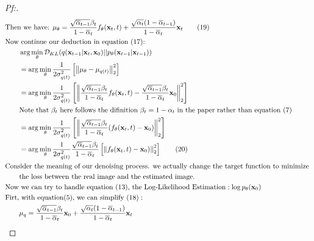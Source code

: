\documentclass{article}
\begin{document}
\begin{proof}[\textit{Pf:}]
\begin{align}
        &\text{Then we have: } \mu_{\theta} = \frac{\sqrt{\overline{\alpha}_{t-1}}\beta_t}{1-\overline{\alpha}_t}f_{\theta}(\mathbf{x}_t, t) + \frac{\sqrt{\alpha_{t}}(1-\overline{\alpha}_{t-1})}{1-\overline{\alpha}_t}\mathbf{x}_t \tag{19} \\
        &\text{Now continue our deduction in equation (17): } \notag \\
        &\qquad\arg\min_{\theta} \mathcal{D}_{KL}(q(\mathbf{x}_{t-1}|\mathbf{x}_t, \mathbf{x}_0) || p_{\theta}(\mathbf{x}_{t-1}|\mathbf{x}_{t-1})) \notag \\
        &\qquad = \arg\min_{\theta} \frac{1}{2\sigma_{q(t)}^2} \left[ \left\lVert  \mu_{\theta} - \mu_{q(t)} \right\rVert ^2_2 \right] \notag \\
        &\qquad = \arg\min_{\theta} \frac{1}{2\sigma_{q(t)}^2} \left[ 
            \left\lVert \frac{\sqrt{\overline{\alpha}_{t-1}}\beta_t}{1-\overline{\alpha}_t}f_{\theta}(\mathbf{x}_t, t) 
            - \frac{\sqrt{\overline{\alpha}_{t-1}}\beta_t}{1-\overline{\alpha}_t}\mathbf{x}_0 \right\rVert ^2_2\right] \notag \\
        &\qquad\text{Note that } \beta_t\text{ here follows the difinition }\beta_t=1-\alpha_t \text{ in the paper rather than equation (7)} \notag \\
        &\qquad = \arg\min_{\theta} \frac{1}{2\sigma_{q(t)}^2} \left[ 
            \left\lVert \frac{\sqrt{\overline{\alpha}_{t-1}}\beta_t}{1-\overline{\alpha}_t}(f_{\theta}(\mathbf{x}_t, t) 
            - \mathbf{x}_0) \right\rVert ^2_2\right] \notag \\
        &\qquad = \arg\min_{\theta} \frac{1}{2\sigma_{q(t)}^2} \frac{\sqrt{\overline{\alpha}_{t-1}}\beta_t}{1-\overline{\alpha}_t}
            \left[ \left\lVert f_{\theta}(\mathbf{x}_t, t)- \mathbf{x}_0) \right\rVert^2_2 \right] \tag{20} \\
        &\text{Consider the meaning of our denoising process. we actually change the target function to minimize } \notag \\
        &\qquad\text{the loss between the real image and the estimated image.} \notag \\
        &\text{Now we can try to handle equation (13), the Log-Likelihood Estimation}: \log p_{\theta}(\mathbf{x}_0) \notag \\
        &\text{Firt, with equation(5), we can simplify (18)}: \notag \\
        &\qquad \mu_q = \frac{\sqrt{\overline{\alpha}_{t-1}}\beta_t}{1-\overline{\alpha}_t}\mathbf{x}_0 + \frac{\sqrt{\alpha_t}(1-\overline{\alpha}_{t-1})}{1-\overline{\alpha}_t}\mathbf{x}_t \notag \\

\end{align}
\end{proof}
\end{document}
